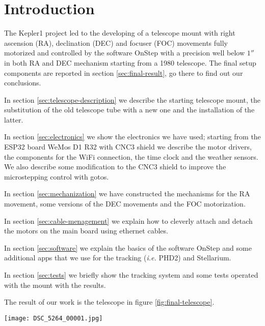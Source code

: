 \section*{Introduction}
\label{sec:Introduction}
The Kepler1 project led to the developing of a telescope mount with right ascension (RA), declination (DEC) and focuser (FOC) movements fully motorized and controlled by the software OnStep with a precision well below \(1''\) in both RA and DEC mechanism starting from a 1980 telescope.
The final setup components are reported in section \ref{sec:final-result}, go there to find out our conclusions.

In section \ref{sec:telescope-description} we describe the starting telescope mount, the substitution of the old telescope tube with a new one and the installation of the latter.

In section \ref{sec:electronics} we show the electronics we have used;
starting from the ESP32 board WeMos D1 R32 with CNC3 shield we describe the motor drivers, the components for the WiFi connection, the time clock and the weather sensors.
We also describe some modification to the CNC3 shield to improve the microstepping control with gotos.

In section \ref{sec:mechanization} we have constructed the mechanisms for the RA movement, some versions of the DEC movements and the FOC motorization.

In section \ref{sec:cable-menagement} we explain how to cleverly attach and detach the motors on the main board using ethernet cables.

In section \ref{sec:software} we explain the basics of the software OnStep and some additional apps that we use for the tracking (\textit{i.e.} PHD2) and Stellarium.

In section \ref{sec:tests} we briefly show the tracking system and some tests operated with the mount with the results.

The result of our work is the telescope in figure \ref{fig:final-telescope}.

\begin{minipage}{0.5\textwidth}
    \centering
    \texttt{[image: DSC\_5264\_00001.jpg]}
    \label{fig:final-telescope}
\end{minipage}